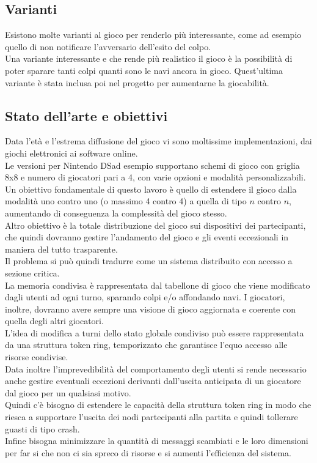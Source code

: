 \documentclass{llncs}
\begin{document}
\subsection{Varianti}
Esistono molte varianti al gioco per renderlo più interessante, come ad esempio quello di non notificare l'avversario dell'esito del colpo.\\
Una variante interessante e che rende più realistico il gioco è la possibilità di poter sparare tanti colpi quanti sono le navi ancora in gioco. Quest'ultima variante è stata inclusa poi nel progetto per aumentarne la giocabilità. \\
\subsection{Stato dell'arte e obiettivi}
Data l'età e l'estrema diffusione del gioco vi sono moltissime implementazioni, dai giochi elettronici ai software online.\\
Le versioni per Nintendo DS\texttrademark ad esempio supportano schemi di gioco con griglia 8x8 e numero di giocatori pari a 4, con varie opzioni e modalità personalizzabili.\\
Un obiettivo fondamentale di questo lavoro è quello di estendere il gioco dalla modalità uno contro uno (o massimo 4 contro 4) a quella di tipo $n$ contro $n$, aumentando di conseguenza la complessità del gioco stesso.\\
Altro obiettivo è la totale distribuzione del gioco sui dispositivi dei partecipanti, che quindi dovranno gestire l'andamento del gioco e gli eventi eccezionali in maniera del tutto trasparente.\\
Il problema si può quindi tradurre come un sistema distribuito con accesso a sezione critica.\\
La memoria condivisa è rappresentata dal tabellone di gioco che viene modificato dagli utenti ad ogni turno, sparando colpi e/o affondando navi. I giocatori, inoltre, dovranno avere sempre una visione di gioco aggiornata e coerente con quella degli altri giocatori.\\
L'idea di modifica a turni dello stato globale condiviso può essere rappresentata da una struttura token ring, temporizzato che garantisce l'equo accesso alle risorse condivise.\\
Data inoltre l'imprevedibilità del comportamento degli utenti si rende necessario anche gestire eventuali eccezioni derivanti dall'uscita anticipata di un giocatore dal gioco per un qualsiasi motivo.\\
Quindi c'è bisogno di estendere le capacità della struttura token ring in modo che riesca a supportare l'uscita dei nodi partecipanti alla partita e quindi tollerare guasti di tipo crash.\\
Infine bisogna minimizzare la quantità di messaggi scambiati e le loro dimensioni per far si che non ci sia spreco di risorse e si aumenti l'efficienza del sistema.
\end{document}
